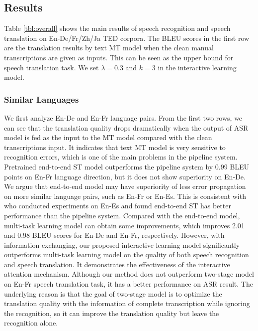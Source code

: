 \documentclass[letterpaper]{article} %
\begin{document}
\subsection{Results}
Table \ref{tbl:overall} shows the main results of speech recognition and speech translation on En-De/Fr/Zh/Ja TED corpora. The BLEU scores in the first row are the translation results by text MT model when the clean manual transcriptions are given as inputs. This can be seen as the upper bound for speech translation task. 
We set $\lambda=0.3$ and $k=3$ in the interactive learning model. 

\subsubsection{Similar Languages}
We first analyze En-De and En-Fr language pairs. From the first two rows, we can see that the translation quality drops dramatically when the output of ASR model is fed as the input to the MT model compared with the clean transcriptions input. It indicates that text MT model is very sensitive to recognition errors, which is one of the main problems in the pipeline system.
Pretrained end-to-end  ST model outperforms the pipeline system by 0.99 BLEU points on En-Fr language direction, but it does not show superiority on En-De. 
We argue that end-to-end model may have superiority of less error propagation on more similar language pairs, such as En-Fr or En-Es. This is consistent with \citeauthor{weiss2017sequence}~ who conducted experiments on En-Es and found end-to-end ST has better performance than the pipeline system. 
Compared with the end-to-end model, multi-task learning model can obtain some improvements, which improves 2.01 and 0.98 BLEU scores for En-De and En-Fr, respectively.
However, with information exchanging, our proposed interactive learning model significantly outperforms multi-task learning model on the quality of both speech recognition and speech translation. 
It demonstrates the effectiveness of the interactive attention mechanism. 
Although our method does not outperform two-stage model on En-Fr speech translation task, it has a better performance on ASR result. The underlying reason is that the goal of two-stage model is to optimize the translation quality with the information of complete transcription while ignoring the recognition, so it can improve the translation quality but leave the recognition alone. 
\end{document}
